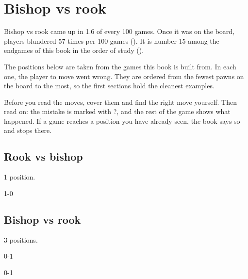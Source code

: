 \chapter{Bishop vs rook}\label{ch:bishop-vs-rook}
Bishop vs rook came up in 1.6 of every 100 games. Once it was on the board, players blundered 57 times per 100 games (). It is number 15 among the endgames of this book in the order of study ().

The positions below are taken from the games this book is built from. In each one, the player to move went wrong. They are ordered from the fewest pawns on the board to the most, so the first sections hold the cleanest examples.

Before you read the moves, cover them and find the right move yourself. Then read on: the mistake is marked with ?, and the rest of the game shows what happened. If a game reaches a position you have already seen, the book says so and stops there.


\section{Rook vs bishop}
1 position.


1-0\par
\section{Bishop vs rook}
3 positions.


0-1\par
{}

0-1\par
{}


